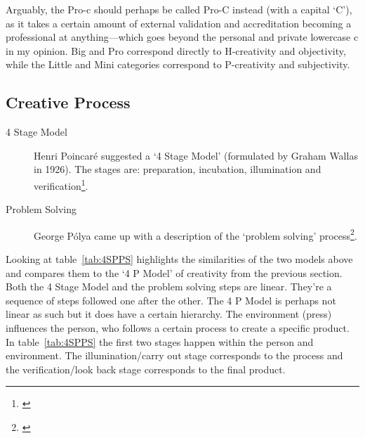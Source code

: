 Arguably, the Pro-c should perhaps be called Pro-C instead (with a capital `C'), as it takes a certain amount of external validation and accreditation becoming a professional at anything---which goes beyond the personal and private lowercase c in my opinion. Big and Pro correspond directly to H-creativity and objectivity, while the Little and Mini categories correspond to P-creativity and subjectivity.




\subsection{Creative Process}

\begin{description}
  \item [4 Stage Model] Henri Poincaré suggested a `4 Stage Model' (formulated by Graham Wallas in 1926). The stages are: preparation, incubation, illumination and verification\footnote{\autocite{Poincare2001, Wallas1926}}.
  \item [Problem Solving] George Pólya came up with a description of the `problem solving' process\footnote{\autocite{Polya1957}}.
\end{description}

Looking at table~\ref{tab:4SPPS} highlights the similarities of the two models above and compares them to the `4 P Model' of creativity from the previous section. Both the 4 Stage Model and the problem solving steps are linear. They're a sequence of steps followed one after the other. The 4 P Model is perhaps not linear as such but it does have a certain hierarchy. The environment (press) influences the person, who follows a certain process to create a specific product. In table~\ref{tab:4SPPS} the first two stages happen within the person and environment. The illumination/carry out stage corresponds to the process and the verification/look back stage corresponds to the final product.

